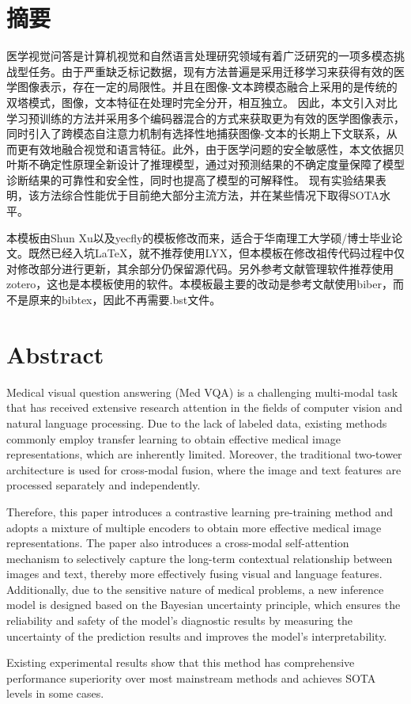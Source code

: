 \chapter{摘\texorpdfstring{\quad}{}要}
	医学视觉问答是计算机视觉和自然语言处理研究领域有着广泛研究的一项多模态挑战型任务。由于严重缺乏标记数据，现有方法普遍是采用迁移学习来获得有效的医学图像表示，存在一定的局限性。并且在图像-文本跨模态融合上采用的是传统的双塔模式，图像，文本特征在处理时完全分开，相互独立。
	因此，本文引入对比学习预训练的方法并采用多个编码器混合的方式来获取更为有效的医学图像表示，同时引入了跨模态自注意力机制有选择性地捕获图像-文本的长期上下文联系，从而更有效地融合视觉和语言特征。此外，由于医学问题的安全敏感性，本文依据贝叶斯不确定性原理全新设计了推理模型，通过对预测结果的不确定度量保障了模型诊断结果的可靠性和安全性，同时也提高了模型的可解释性。
	现有实验结果表明，该方法综合性能优于目前绝大部分主流方法，并在某些情况下取得SOTA水平。

	本模板由Shun Xu\cite{_}以及yecfly\cite{_a}的模板修改而来，适合于华南理工大学硕/博士毕业论文。既然已经入坑LaTeX，就不推荐使用LYX，但本模板在修改祖传代码过程中仅对修改部分进行更新，其余部分仍保留源代码。另外参考文献管理软件推荐使用zotero，这也是本模板使用的软件。本模板最主要的改动是参考文献使用biber，而不是原来的bibtex，因此不再需要.bst文件。


\chapter{Abstract}
	Medical visual question answering (Med VQA) is a challenging multi-modal task that has received extensive research attention in the fields of computer vision and natural language processing. Due to the lack of labeled data, existing methods commonly employ transfer learning to obtain effective medical image representations, which are inherently limited. Moreover, the traditional two-tower architecture is used for cross-modal fusion, where the image and text features are processed separately and independently.
	
	Therefore, this paper introduces a contrastive learning pre-training method and adopts a mixture of multiple encoders to obtain more effective medical image representations. The paper also introduces a cross-modal self-attention mechanism to selectively capture the long-term contextual relationship between images and text, thereby more effectively fusing visual and language features. Additionally, due to the sensitive nature of medical problems, a new inference model is designed based on the Bayesian uncertainty principle, which ensures the reliability and safety of the model's diagnostic results by measuring the uncertainty of the prediction results and improves the model's interpretability.
	
	Existing experimental results show that this method has comprehensive performance superiority over most mainstream methods and achieves SOTA levels in some cases.

